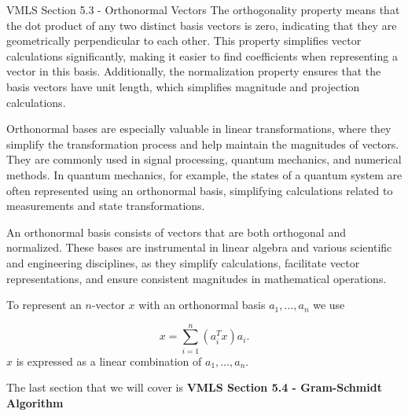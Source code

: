 \begin{notes}{VMLS Section 5.3 - Orthonormal Vectors}
    The orthogonality property means that the dot product of any two distinct basis vectors is zero, indicating that they are geometrically perpendicular to each other. This property simplifies vector 
    calculations significantly, making it easier to find coefficients when representing a vector in this basis. Additionally, the normalization property ensures that the basis vectors have unit length, 
    which simplifies magnitude and projection calculations.
    
    Orthonormal bases are especially valuable in linear transformations, where they simplify the transformation process and help maintain the magnitudes of vectors. They are commonly used in signal 
    processing, quantum mechanics, and numerical methods. In quantum mechanics, for example, the states of a quantum system are often represented using an orthonormal basis, simplifying calculations 
    related to measurements and state transformations.
    
    An orthonormal basis consists of vectors that are both orthogonal and normalized. These bases are instrumental in linear algebra and various scientific and engineering disciplines, as they simplify 
    calculations, facilitate vector representations, and ensure consistent magnitudes in mathematical operations.

    \begin{highlight}
        To represent an $n$-vector $x$ with an orthonormal basis $a_{1}, \dots, a_{n}$ we use

        \begin{equation*}
            x = \sum_{i = 1}^{n} (a_{i}^{T}x)a_{i}.
        \end{equation*}
        $x$ is expressed as a linear combination of $a_{1}, \dots, a_{n}$.
    \end{highlight}
\end{notes}

The last section that we will cover is \textbf{VMLS Section 5.4 - Gram-Schmidt Algorithm}

